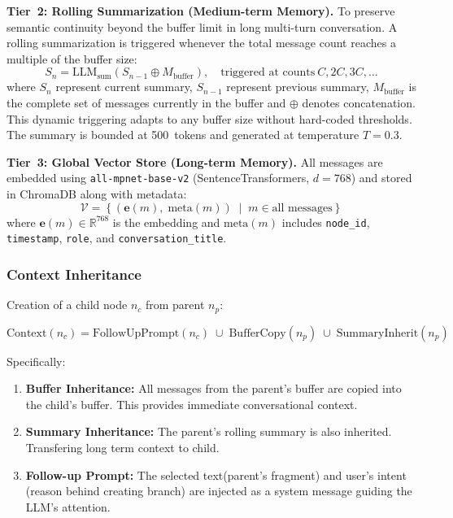 \documentclass[pdflatex,sn-mathphys-num]{sn-jnl}%
\theoremstyle{thmstyleone}%
\theoremstyle{thmstyletwo}%
\theoremstyle{thmstylethree}%
\begin{document}
\textbf{Tier~2: Rolling Summarization (Medium-term Memory).}
To preserve semantic continuity beyond the buffer limit in long multi-turn conversation. A rolling summarization is triggered whenever the total message count reaches a multiple of the buffer size:
\begin{equation}
S_{n} = \text{LLM}_{\text{sum}}\!\left(S_{n-1} \oplus M_{\text{buffer}}\right), \quad \text{triggered at counts}\ C, 2C, 3C, \ldots
\label{eq:summary}
\end{equation}
where $S_n$ represent current summary, $S_{n-1}$ represent previous summary, $M_{\text{buffer}}$ is the complete set of messages currently in the buffer and $\oplus$ denotes concatenation. This dynamic triggering adapts to any buffer size without hard-coded thresholds. The summary is bounded at 500~tokens and generated at temperature $T{=}0.3$.

\textbf{Tier~3: Global Vector Store (Long-term Memory).}
All messages are embedded using \texttt{all-mpnet-base-v2} (SentenceTransformers, $d{=}768$) and stored in ChromaDB along with metadata:
\begin{equation}
\mathcal{V} = \left\{\left(\mathbf{e}(m),\; \text{meta}(m)\right) \;\middle|\; m \in \text{all messages}\right\}
\label{eq:vectorstore}
\end{equation}
where $\mathbf{e}(m) \in \mathbb{R}^{768}$ is the embedding and $\text{meta}(m)$ includes \texttt{node\_id}, \texttt{timestamp}, \texttt{role}, and \texttt{conversation\_title}. 

\subsubsection{Context Inheritance}\label{subsubsec:inheritance}

Creation of a child node $n_c$ from parent $n_p$:

\begin{equation}
\text{Context}(n_c) = \text{FollowUpPrompt}(n_c) \;\cup\; \text{BufferCopy}(n_p) \;\cup\; \text{SummaryInherit}(n_p)
\label{eq:inheritance}
\end{equation}

Specifically:
\begin{enumerate}
    \item \textbf{Buffer Inheritance:} All messages from the parent's buffer are copied into the child's buffer. This provides immediate conversational context.
    \item \textbf{Summary Inheritance:} The parent's rolling summary is also inherited. Transfering long term context to child.
    \item \textbf{Follow-up Prompt:} The selected text(parent's fragment) and user's intent (reason behind creating branch) are injected as a system message guiding the LLM's attention.
\end{enumerate}
\end{document}
